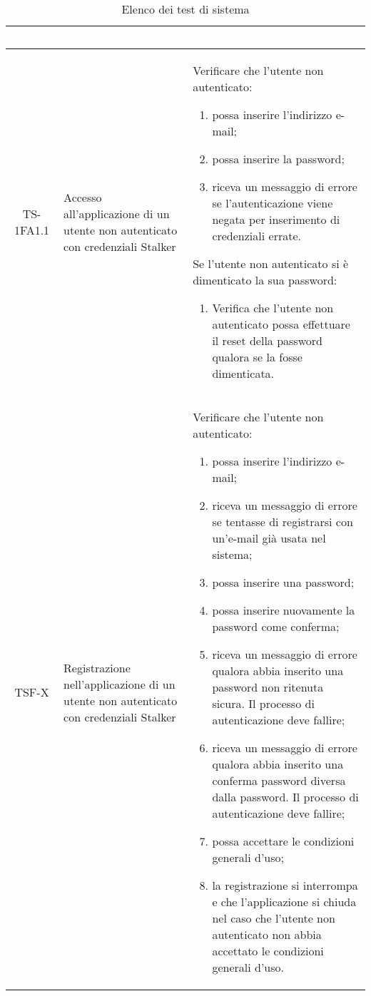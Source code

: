 {
\renewcommand{\arraystretch}{1.5}
\centering
\begin{longtable}{ c | C{3cm} | C{11cm} }
\caption{Elenco dei test di sistema}\\
\textcolor{white}{\textbf{Codice}} & \textcolor{white}{\textbf{Titolo}} & \textcolor{white}{\textbf{Descrizione}} \\
\hline
\endhead

TS-1FA1.1 & Accesso all'applicazione di un utente non autenticato con credenziali Stalker &
Verificare che l'utente non autenticato:
\begin{enumerate}
    \item possa inserire l'indirizzo e-mail;
    \item possa inserire la password;
    \item riceva un messaggio di errore se l'autenticazione viene negata per inserimento di credenziali errate.
\end{enumerate}
Se l'utente non autenticato si è dimenticato la sua password:
\begin{enumerate}
    \item Verifica che l'utente non autenticato possa effettuare il reset della password qualora se la fosse dimenticata.
\end{enumerate} \\

TSF-X & Registrazione nell'applicazione di un utente non autenticato con credenziali Stalker &
Verificare che l'utente non autenticato:
\begin{enumerate}
    \item possa inserire l'indirizzo e-mail;
    \item riceva un messaggio di errore se tentasse di registrarsi con un'e-mail già usata nel sistema;
    \item possa inserire una password;
    \item possa inserire nuovamente la password come conferma;
    \item riceva un messaggio di errore qualora abbia inserito una password non ritenuta sicura. Il processo di autenticazione deve fallire;
    \item riceva un messaggio di errore qualora abbia inserito una conferma password diversa dalla password. Il processo di autenticazione deve fallire;
    \item possa accettare le condizioni generali d'uso;
    \item la registrazione si interrompa e che l'applicazione si chiuda nel caso che l'utente non autenticato non abbia accettato le condizioni generali d'uso.
\end{enumerate} \\


\end{longtable}}
